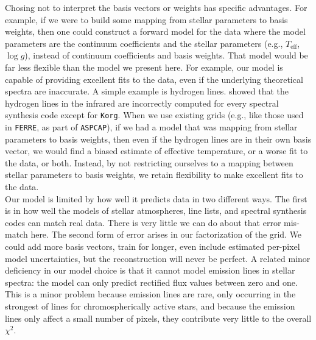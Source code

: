 \documentclass[modern]{aastex631}
\begin{document}
Chosing not to interpret the basis vectors or weights has specific advantages. For example, if we were to build some mapping from stellar parameters to basis weights, then one could construct a forward model for the data where the model parameters are the continuum coefficients and the stellar parameters (e.g., $T_\mathrm{eff}$, $\log{g}$), instead of continuum coefficients and basis weights. That model would be far less flexible than the model we present here. For example, our model is capable of providing excellent fits to the data, even if the underlying theoretical spectra are inaccurate. A simple example is hydrogen lines. \citep{Wheeler} showed that the hydrogen lines in the infrared are incorrectly computed for every spectral synthesis code except for \texttt{Korg}. When we use existing grids (e.g., like those used in \texttt{FERRE}, as part of \texttt{ASPCAP}), if we had a model that was mapping from stellar parameters to basis weights, then even if the hydrogen lines are in their own basis vector, we would find a biased estimate of effective temperature, or a worse fit to the data, or both. Instead, by not restricting ourselves to a mapping between stellar parameters to basis weights, we retain flexibility to make excellent fits to the data.\\



Our model is limited by how well it predicts data in two different ways. The first is in how well the models of stellar atmospheres, line lists, and spectral synthesis codes can match real data. There is very little we can do about that error mis-match here. The second form of error arises in our factorization of the grid. We could add more basis vectors, train for longer, even include estimated per-pixel model uncertainties, but the reconstruction will never be perfect. A related minor deficiency in our model choice is that it cannot model emission lines in stellar spectra: the model can only predict rectified flux values between zero and one. This is a minor problem because emission lines are rare, only occurring in the strongest of lines for chromospherically active stars, and because the emission lines only affect a small number of pixels, they contribute very little to the overall $\chi^2$.\\
\end{document}
